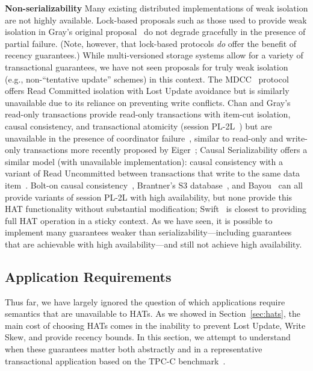 \vspace{.5em}\noindent\textbf{Non-serializability} Many existing
distributed implementations of weak isolation are not highly
available. Lock-based proposals such as those used to provide weak
isolation in Gray's original proposal~\cite{gray-isolation} do not
degrade gracefully in the presence of partial failure. (Note, however,
that lock-based protocols \textit{do} offer the benefit of recency
guarantees.) While multi-versioned storage systems allow for a variety
of transactional guarantees, we have not seen proposals for truly weak
isolation (e.g., non-``tentative update'' schemes) in this context.
The MDCC~\cite{mdcc} protocol offers Read Committed isolation with
Lost Update avoidance but is similarly unavailable due to its reliance
on preventing write conflicts. Chan and Gray's read-only transactions
provide read-only transactions with item-cut isolation, causal
consistency, and transactional atomicity (session PL-2L~\cite{adya})
but are unavailable in the presence of coordinator
failure~\cite{readonly}, similar to read-only and write-only
transactions more recently proposed by Eiger~\cite{eiger}; Causal
Serializability offers a similar model (with unavailable
implementation): causal consistency with a variant of Read Uncommitted
between transactions that write to the same data
item~\cite{raynal-causal}.  Bolt-on causal consistency~\cite{bolton},
Brantner's S3 database~\cite{kraska-s3}, and
Bayou~\cite{sessionguarantees} can all provide variants of session
PL-2L with high availability, but none provide this HAT functionality
without substantial modification; Swift~\cite{swift} is closest to
providing full HAT operation in a sticky context. As we have seen, it
is possible to implement many guarantees weaker than
serializability---including guarantees that are achievable with high
availability---and still not achieve high availability.

\subsection{Application Requirements}

Thus far, we have largely ignored the question of which applications
require semantics that are unavailable to HATs. As we showed in
Section~\ref{sec:hats}, the main cost of choosing HATs comes in the
inability to prevent Lost Update, Write Skew, and provide recency
bounds. In this section, we attempt to understand when these
guarantees matter both abstractly and in a representative
transactional application based on the TPC-C benchmark~\cite{tpcc}.

